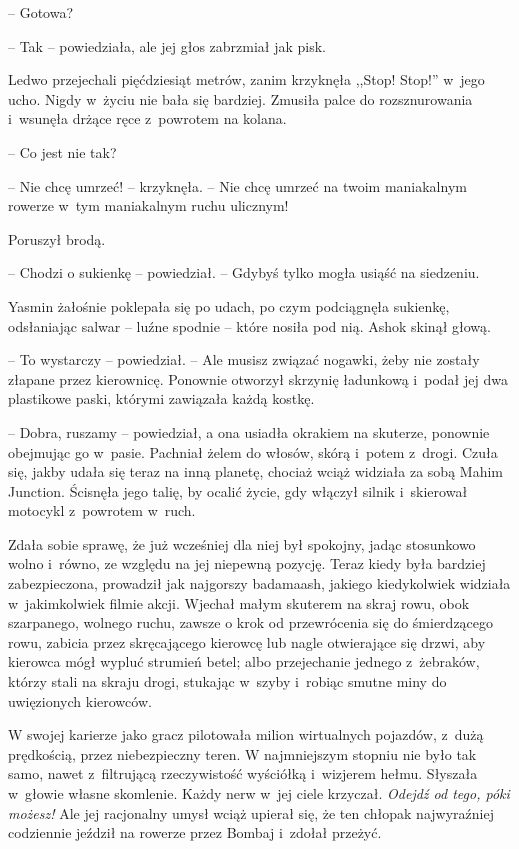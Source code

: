 \documentclass[oneside,polish,11pt,rmheadings]{mwbk}
\begin{document}
-- Gotowa? 

-- Tak -- powiedziała, ale jej głos zabrzmiał jak pisk.

Ledwo przejechali pięćdziesiąt metrów, zanim krzyknęła ,,Stop! Stop!'' w~jego ucho. Nigdy w~życiu nie bała się bardziej. Zmusiła palce do rozsznurowania i~wsunęła drżące ręce z~powrotem na kolana.

-- Co jest nie tak? 

-- Nie chcę umrzeć! -- krzyknęła. -- Nie chcę umrzeć na twoim maniakalnym rowerze w~tym maniakalnym ruchu ulicznym!

Poruszył brodą. 

-- Chodzi o sukienkę -- powiedział. -- Gdybyś tylko mogła usiąść na siedzeniu. 

Yasmin żałośnie poklepała się po udach, po czym podciągnęła sukienkę, odsłaniając salwar -- luźne spodnie -- które nosiła pod nią. Ashok skinął głową. 

-- To wystarczy -- powiedział. -- Ale musisz związać nogawki, żeby nie zostały złapane przez kierownicę. Ponownie otworzył skrzynię ładunkową i~podał jej dwa plastikowe paski, którymi zawiązała każdą kostkę.

-- Dobra, ruszamy -- powiedział, a ona usiadła okrakiem na skuterze, ponownie obejmując go w~pasie. Pachniał żelem do włosów, skórą i~potem z~drogi. Czuła się, jakby udała się teraz na inną planetę, chociaż wciąż widziała za sobą Mahim Junction. Ścisnęła jego talię, by ocalić życie, gdy włączył silnik i~skierował motocykl z~powrotem w~ruch.

Zdała sobie sprawę, że już wcześniej dla niej był spokojny, jadąc stosunkowo wolno i~równo, ze względu na jej niepewną pozycję. Teraz kiedy była bardziej zabezpieczona, prowadził jak najgorszy badamaash, jakiego kiedykolwiek widziała w~jakimkolwiek filmie akcji. Wjechał małym skuterem na skraj rowu, obok szarpanego, wolnego ruchu, zawsze o krok od przewrócenia się do śmierdzącego rowu, zabicia przez skręcającego kierowcę lub nagle otwierające się drzwi, aby kierowca mógł wypluć strumień betel; albo przejechanie jednego z~żebraków, którzy stali na skraju drogi, stukając w~szyby i~robiąc smutne miny do uwięzionych kierowców.

W swojej karierze jako gracz pilotowała milion wirtualnych pojazdów, z~dużą prędkością, przez niebezpieczny teren. W najmniejszym stopniu nie było tak samo, nawet z~filtrującą rzeczywistość wyściółką i~wizjerem hełmu. Słyszała w~głowie własne skomlenie. Każdy nerw w~jej ciele krzyczał. \textit{Odejdź od tego, póki możesz!} Ale jej racjonalny umysł wciąż upierał się, że ten chłopak najwyraźniej codziennie jeździł na rowerze przez Bombaj i~zdołał przeżyć.
\end{document}
